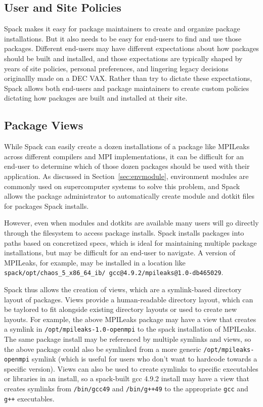 
\subsection{User and Site Policies}
\label{sec:usecase-policy}

Spack makes it easy for package maintainers to create and organize package installations.  But it also needs to be easy for end-users to find and use those packages.  Different end-users may have different expectations about how packages should be built and installed, and those expectations are typically shaped by years of site policies, personal preferences, and lingering legacy decisions originallly made on a DEC VAX.  Rather than try to dictate these expectations, Spack allows both end-users and package maintainers to create custom policies dictating how packages are built and installed at their site.

\subsection{Package Views}
\label{sec:package-views}

While Spack can easily create a dozen installations of a package like MPILeaks across different compilers and MPI implementations, it can be difficult for an end-user to determine which of those dozen packages should be used with their application.  As discussed in Section~\ref{sec:envmodule}, environment modules are commonly used on supercomputer systems to solve this problem, and Spack allows the package administrator to automatically create module and dotkit files for packages Spack installs.

However, even when modules and dotkits are available many users will go directly through the filesystem to access package installs.  Spack installs packages into paths based on concretized specs, which is ideal for maintaining multiple package installations, but may be difficult for an end-user to navigate.  A version of MPILeaks, for example, may be installed in a location like {\tt spack/opt/chaos\_5\_x86\_64\_ib/ gcc@4.9.2/mpileaks@1.0-db465029}.

Spack thus allows the creation of views, which are a symlink-based directory layout of packages.  Views provide a human-readable directory layout, which can be taylored to fit alongside existing directory layouts or used to create new layouts.  For example, the above MPILeaks package may have a view that creates a symlink in {\tt /opt/mpileaks-1.0-openmpi} to the spack installation of MPILeaks.  The same package install may be referenced by multiple symlinks and views, so the above package could also be symlinked from a more generic {\tt /opt/mpileaks-openmpi} symlink (which is useful for users who don't want to hardcode towards a specific version).  Views can also be used to create symlinks to specific executables or libraries in an install, so a spack-built gcc 4.9.2 install may have a view that creates symlinks from {\tt /bin/gcc49} and {\tt /bin/g++49} to the appropriate {\tt gcc} and {\tt g++} executables.

